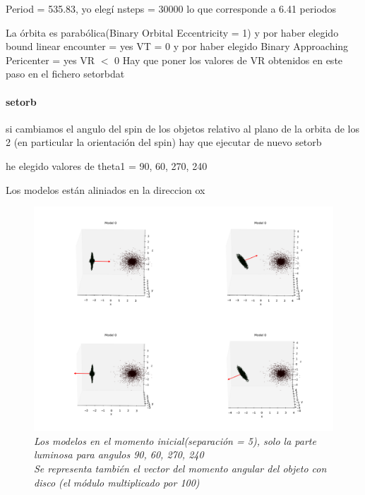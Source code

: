 \documentclass[12pt]{article} %
\renewcommand{\=}[1]{\stackrel{#1}{=}} %
\theoremstyle{definition}
\theoremstyle{remark}
\begin{document}
\begin{description}
\begin{verbatim}
\end{verbatim}

\item Period = 535.83, yo elegí nsteps = 30000 lo que corresponde a 6.41 periodos

\item La órbita es parabólica(Binary Orbital Eccentricity = 1) y por haber elegido  bound linear encounter = yes VT = 0 y por haber elegido Binary Approaching Pericenter = yes VR $<$ 0
Hay que poner los valores de VR obtenidos en este paso en el fichero setorbdat


\end{description}

\paragraph{setorb}

\begin{description}
\item  si cambiamos el angulo del spin de los objetos relativo al plano de la orbita de los 2 (en particular la orientación del spin)
hay que ejecutar de nuevo setorb 

he elegido valores de theta1 = 90, 60, 270, 240

Los modelos están aliniados en la direccion ox

\end{description}
\newpage

\begin{figure}[!ht]
 \centering
 \includegraphics[scale=0.2]{inimod_sep5.png}
 \caption{\emph{Los modelos en el momento inicial(separación = 5), solo la parte luminosa para angulos 90, 60, 270, 240 \\
	Se representa también el vector del momento angular del objeto con disco (el módulo multiplicado por 100) }}
\end{figure}
\end{document}
